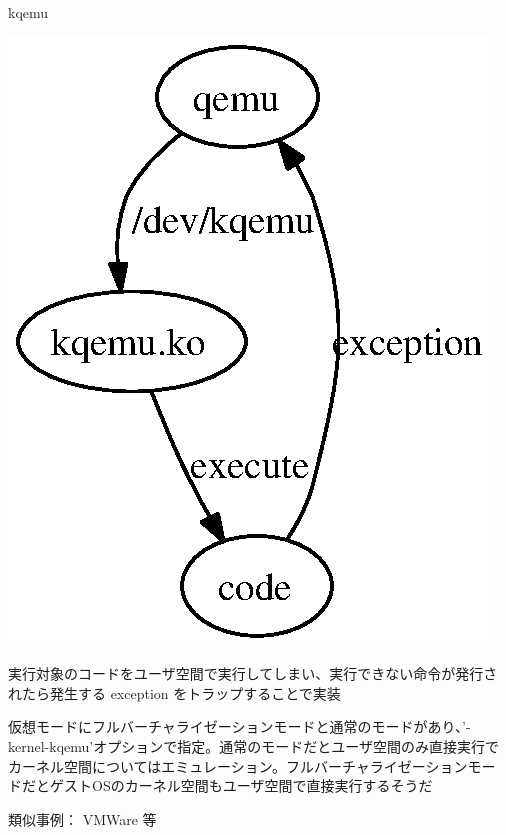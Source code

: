 \documentclass[cjk,dvipdfmx]{beamer}
\begin{document}
\begin{frame}{kqemu}
\begin{minipage}[]{0.4\hsize}
 \includegraphics[width=0.9\hsize]{image200703/kqemu.eps}
\end{minipage}
\begin{minipage}[]{0.55\hsize}
 実行対象のコードをユーザ空間で実行してしまい、実行できない命令が発行さ
 れたら発生する exception をトラップすることで実装

 仮想モードにフルバーチャライゼーションモードと通常のモードがあり、'-
 kernel-kqemu'オプションで指定。通常のモードだとユーザ空間のみ直接実行で
 カーネル空間についてはエミュレーション。フルバーチャライゼーションモー
 ドだとゲストOSのカーネル空間もユーザ空間で直接実行するそうだ

類似事例：
 VMWare 等
\end{minipage}
\end{frame}
\end{document}
